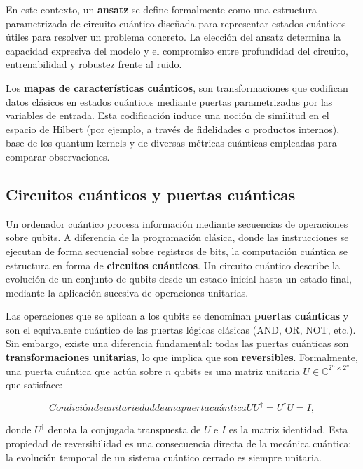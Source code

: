 En este contexto, un \textbf{ansatz} se define formalmente como una estructura parametrizada de circuito cuántico diseñada para representar estados cuánticos útiles para resolver un problema concreto. La elección del ansatz determina la capacidad expresiva del modelo y el compromiso entre profundidad del circuito, entrenabilidad y robustez frente al ruido.

Los \textbf{mapas de características cuánticos}, son transformaciones que codifican datos clásicos en estados cuánticos mediante puertas parametrizadas por las variables de entrada. Esta codificación induce una noción de similitud en el espacio de Hilbert (por ejemplo, a través de fidelidades o productos internos), base de los quantum kernels y de diversas métricas cuánticas empleadas para comparar observaciones.

\subsection{Circuitos cuánticos y puertas cuánticas}
\label{ap:subsec:circuitos_puertas}

Un ordenador cuántico procesa información mediante secuencias de operaciones sobre qubits. A diferencia de la programación clásica, donde las instrucciones se ejecutan de forma secuencial sobre registros de bits, la computación cuántica se estructura en forma de \textbf{circuitos cuánticos}. Un circuito cuántico describe la evolución de un conjunto de qubits desde un estado inicial hasta un estado final, mediante la aplicación sucesiva de operaciones unitarias.

Las operaciones que se aplican a los qubits se denominan \textbf{puertas cuánticas}\cite{salasperalta2012diabaticgates} y son el equivalente cuántico de las puertas lógicas clásicas (AND, OR, NOT, etc.). Sin embargo, existe una diferencia fundamental: todas las puertas cuánticas son \textbf{transformaciones unitarias}, lo que implica que son \textbf{reversibles}. Formalmente, una puerta cuántica que actúa sobre $n$ qubits es una matriz unitaria $U \in \mathbb{C}^{2^n \times 2^n}$ que satisface:

\begin{equation}[ap:eq:unitaria]{Condición de unitariedad de una puerta cuántica}
U U^\dagger = U^\dagger U = I,
\end{equation}

donde $U^\dagger$ denota la conjugada transpuesta de $U$ e $I$ es la matriz identidad. Esta propiedad de reversibilidad es una consecuencia directa de la mecánica cuántica: la evolución temporal de un sistema cuántico cerrado es siempre unitaria.


